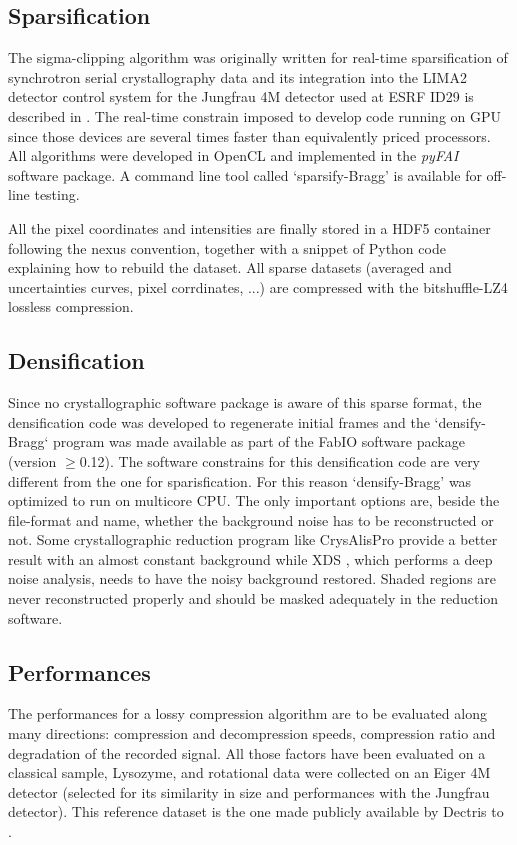\documentclass[preprint]{iucr}              %
\begin{document}
\subsection{Sparsification}

The sigma-clipping algorithm was originally written for real-time sparsification of synchrotron serial crystallography data and its integration into the LIMA2 \cite{lima2} detector control system for the Jungfrau 4M detector used at ESRF ID29 is described in \cite{sri2021}.
The real-time constrain imposed to develop code running on GPU since those devices are several times
faster than equivalently priced processors.
All algorithms were developed in OpenCL \cite{opencl_khronos} and implemented in the \textit{pyFAI} software package.
A command line tool called `sparsify-Bragg' is available for off-line testing.

All the pixel coordinates and intensities are finally stored in a HDF5 \cite{hdf5} container following the nexus \cite{nexus} convention, together with a snippet of Python code explaining how to rebuild the dataset.
All sparse datasets (averaged and uncertainties curves, pixel corrdinates, ...) are compressed with the bitshuffle-LZ4 \cite{bitshuffle} lossless compression.

\subsection{Densification}
Since no crystallographic software package is aware of this sparse format, the densification code was developed to regenerate initial frames and the `densify-Bragg` program was made available as part of the FabIO \cite{fabio} software package (version $\ge$0.12). 
The software constrains for this densification code are very different from the one for sparisfication. For this reason `densify-Bragg' was optimized to run on multicore CPU. 
The only important options are, beside the file-format and name, whether the background noise has to be reconstructed or not. 
Some crystallographic reduction program like CrysAlisPro \cite{crysalis} provide a better result with an almost constant background while XDS \cite{xds}, which performs a deep noise analysis, needs to have the noisy background restored. 
Shaded regions are never reconstructed properly and should be masked adequately in the reduction software.

\subsection{Performances}
The performances for a lossy compression algorithm are to be evaluated along many directions: compression and decompression speeds, compression ratio and degradation of the recorded signal.
All those factors have been evaluated on a classical sample, Lysozyme, and rotational data were collected on an Eiger 4M detector (selected for its similarity in size and performances with the Jungfrau detector). 
This reference dataset is the one made publicly available by Dectris to \cite{lysozyme}. 
\end{document}

